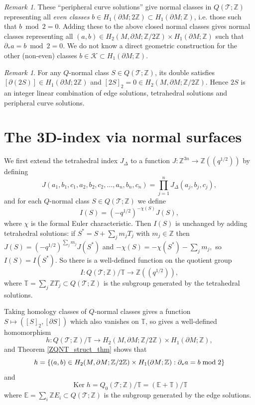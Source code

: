 \documentclass[12pt,reqno]{amsart}  %
\theoremstyle{definition}
\theoremstyle{remark}
\newtheorem{rmk}[thm]{Remark}
\newcommand{\TT}{\mathbb{T}}
\def\be{  \begin{equation} }
\def\ee{  \end{equation} }
\newcommand{\T}{\mathcal{T}}
\def\Z{\mathbb Z}
\def\JD{J_{\Delta}}
\def\bd{\partial}
\DeclareMathOperator{\Ker}{Ker}
\let\Im\relax
\DeclareMathOperator{\Im}{Im}
\def\TT{\mathbb T}   %
\def\EE{\mathbb E}   %
\begin{document}
\begin{rmk} 
These ``peripheral curve solutions'' give normal classes in $Q(\T;\Z)$
representing all {\em even classes}  
$b \in H_1(\bd  M; 2\Z) \subset  H_1(\bd  M; \Z) $, i.e. those such that
$ b \bmod 2 = 0$.  Adding these to the above closed normal classes gives 
normal classes representing all $(a,b) \in  H_2(M,\bd M;\Z/2\Z) \times 
H_1(\bd M;\Z)$ such that $\bd_* a =   b \bmod 2  =0$.
We do not know a direct geometric construction for the other (non-even) 
classes $b \in \mathcal K \subset  H_1(\bd  M; \Z)$.
\end{rmk}

\begin{rmk}
\label{half-integer-coefs}
For any $Q$-normal class $S \in Q(\T;\Z)$, its double satisfies 
$[\bd (2S)]\in H_1(\bd M;2\Z)$ and $[2S]_2=0 \in H_2(M,\bd M;\Z/2\Z)$. Hence
$2S$ is an integer linear combination of edge solutions, tetrahedral 
solutions and peripheral curve solutions.
\end{rmk}


\section{The 3D-index via normal surfaces}
\label{sect:index_via_normal_surfaces}

We first extend the tetrahedral index $J_\Delta$ to a function
$J: \Z^{3n} \to \Z((q^{1/2}))$ by defining 
\be
J(a_1, b_1, c_1, a_2, b_2, c_2, \ldots , a_n, b_n, c_n) = 
\prod_{j=1}^n \JD(a_j,b_j,c_j),
\ee
and for each $Q$-normal class $S \in Q(\T;\Z)$ we define
\be
I(S)= (-q^{1/2})^{-\chi(S)}  J(S),
\ee
where $\chi$ is the formal Euler characteristic.
Then  $I(S)$ is unchanged by adding tetrahedral solutions:
if $S^* = S + \sum_j m_j T_j$ with $m_j \in \Z$ then
$J(S)=(-q^{1/2})^{\sum_j m_j} J(S^*)$ and 
$-\chi(S)= -\chi(S^*)-\sum_j m_j ,$
so $I(S)=I(S^*)$.
So there is a well-defined function on the quotient group
\be
I: Q(\T;\Z)/\TT \to \Z((q^{1/2})),
\ee
where $\TT= \sum_j \Z T_j \subset Q(\T;\Z)$ is the subgroup generated by 
the tetrahedral solutions.

Taking homology classes of $Q$-normal classes gives a function 
$S \mapsto ([S]_2,[\bd S])$ which also vanishes  on $ \TT$,
so gives a well-defined homomorphism
\be
h : Q(\T;\Z)/\TT \to H_2(M,\bd M;\Z/2\Z) \times H_1(\bd M;\Z),
\ee
and Theorem \ref{ZQNT_struct_thm} shows that
\be
\Im h =\{ (a,b) \in H_2(M,\bd M;\Z/2\Z) \times  H_1(\bd M;\Z) :  
\bd_* a = b \bmod 2\}
\ee
and 
\be
\Ker h = Q_0(\T;\Z)/\TT = (\EE + \TT)/\TT
\ee
where $\EE = \sum_i \Z E_i\subset Q(\T;\Z)$ is the subgroup generated 
by the edge solutions.
\end{document}
